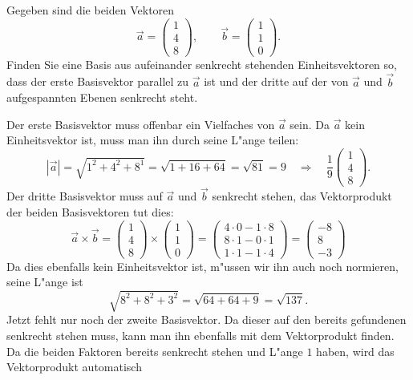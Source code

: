 Gegeben sind die beiden Vektoren
\[
\vec a
=
\begin{pmatrix}
1\\4\\8
\end{pmatrix}
,\qquad
\vec b
=
\begin{pmatrix}
1\\1\\0
\end{pmatrix}.
\]
Finden Sie eine Basis aus aufeinander senkrecht stehenden
Einheitsvektoren so, dass der erste Basisvektor parallel zu
$\vec a$ ist und der dritte auf der von $\vec a$ und $\vec b$
aufgespannten Ebenen senkrecht steht.

\begin{loesung}
Der erste Basisvektor muss offenbar ein Vielfaches von $\vec a$ sein.
Da $\vec a$ kein Einheitsvektor ist, muss man ihn durch seine L"ange
teilen:
\[
|\vec a|=\sqrt{1^2+4^2+8^1}=\sqrt{1+16+64}=\sqrt{81}=9
\quad
\Rightarrow
\quad
\frac19
\begin{pmatrix}
1\\4\\8
\end{pmatrix}.
\]
Der dritte Basisvektor muss auf $\vec a$ und $\vec b$ senkrecht stehen,
das Vektorprodukt der beiden Basisvektoren tut dies:
\[
\vec a\times\vec b=
\begin{pmatrix}
1\\4\\8
\end{pmatrix}
\times
\begin{pmatrix}
1\\1\\0
\end{pmatrix}
=
\begin{pmatrix}
4\cdot 0-1\cdot 8\\
8\cdot 1-0\cdot 1\\
1\cdot 1-1\cdot 4
\end{pmatrix}
=
\begin{pmatrix}
-8\\
8\\
-3
\end{pmatrix}
\]
Da dies ebenfalls kein Einheitsvektor ist, m"ussen wir ihn auch noch
normieren, seine L"ange ist
\[
\sqrt{8^2+8^2+ 3^2}=\sqrt{64+64+9}=\sqrt{137}.
\]
Jetzt fehlt nur noch der zweite Basisvektor.
Da dieser auf den bereits
gefundenen senkrecht stehen muss, kann man ihn ebenfalls mit 
dem Vektorprodukt finden. Da die beiden Faktoren bereits senkrecht
stehen und L"ange $1$ haben, wird das Vektorprodukt automatisch

\end{loesung}
